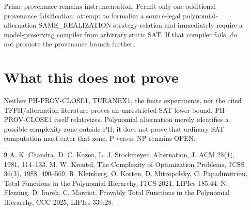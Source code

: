 \documentclass[11pt]{article}
\begin{document}
Prime provenance remains instrumentation. Permit only one additional provenance falsification:
attempt to formalize a source-legal polynomial-alternation SAME\_REALIZATION strategy relation and
immediately require a model-preserving compiler from arbitrary static SAT. If that compiler fails,
do not promote the provenance branch further.

\section*{What this does not prove}
Neither PH-PROV-CLOSE1, TURANEX1, the finite experiments, nor the cited TFPH/alternation literature
proves an unrestricted SAT lower bound. PH-PROV-CLOSE1 itself relativizes. Polynomial alternation
merely identifies a possible complexity zone outside PH; it does not prove that ordinary SAT
computation must enter that zone. P versus NP remains OPEN.

\begin{thebibliography}{9}
 A. K. Chandra, D. C. Kozen, L. J. Stockmeyer,
Alternation, J. ACM 28(1), 1981, 114--133.
 M. W. Krentel, The Complexity of Optimization Problems,
JCSS 36(3), 1988, 490--509.
 R. Kleinberg, O. Korten, D. Mitropolsky, C. Papadimitriou,
Total Functions in the Polynomial Hierarchy, ITCS 2021, LIPIcs 185:44.
 N. Fleming, D. Imrek, C. Marciot,
Provably Total Functions in the Polynomial Hierarchy, CCC 2025, LIPIcs 339:28.
\end{thebibliography}
\end{document}
